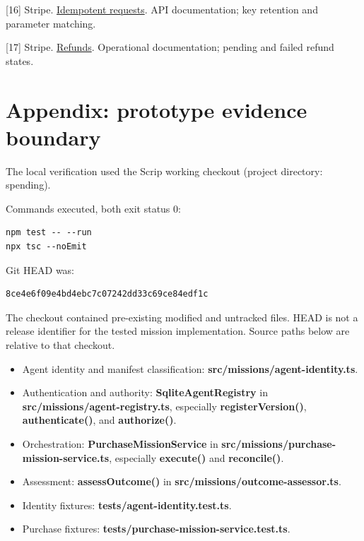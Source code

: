 \documentclass[
  11pt,
  letterpaper,
]{article}
\providecommand{\tightlist}{%
  \setlength{\itemsep}{0pt}\setlength{\parskip}{0pt}}
\begin{document}
{[}16{]} Stripe.
\href{https://docs.stripe.com/api/idempotent_requests}{Idempotent
requests}. API documentation; key retention and parameter matching.

{[}17{]} Stripe. \href{https://docs.stripe.com/refunds}{Refunds}.
Operational documentation; pending and failed refund states.

\section{Appendix: prototype evidence
boundary}\label{appendix-prototype-evidence-boundary}

The local verification used the Scrip working checkout (project
directory: spending).

Commands executed, both exit status 0:

\begin{verbatim}
npm test -- --run
npx tsc --noEmit
\end{verbatim}

Git HEAD was:

\begin{verbatim}
8ce4e6f09e4bd4ebc7c07242dd33c69ce84edf1c
\end{verbatim}

The checkout contained pre-existing modified and untracked files. HEAD
is not a release identifier for the tested mission implementation.
Source paths below are relative to that checkout.

\begin{itemize}
\tightlist
\item
  Agent identity and manifest classification:
  \textbf{src/missions/agent-identity.ts}.
\item
  Authentication and authority: \textbf{SqliteAgentRegistry} in
  \textbf{src/missions/agent-registry.ts}, especially
  \textbf{registerVersion()}, \textbf{authenticate()}, and
  \textbf{authorize()}.
\item
  Orchestration: \textbf{PurchaseMissionService} in
  \textbf{src/missions/purchase-mission-service.ts}, especially
  \textbf{execute()} and \textbf{reconcile()}.
\item
  Assessment: \textbf{assessOutcome()} in
  \textbf{src/missions/outcome-assessor.ts}.
\item
  Identity fixtures: \textbf{tests/agent-identity.test.ts}.
\item
  Purchase fixtures: \textbf{tests/purchase-mission-service.test.ts}.
\end{itemize}
\end{document}
